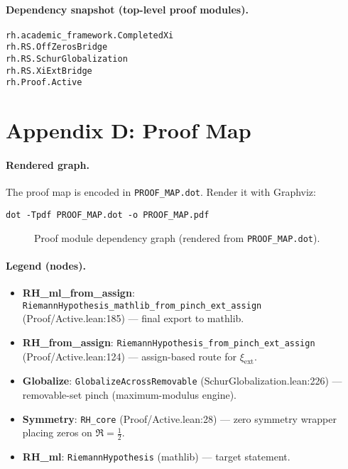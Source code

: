 \documentclass[11pt]{article}
\theoremstyle{plain}
\theoremstyle{definition}
\begin{document}
\paragraph{Dependency snapshot (top-level proof modules).}
{\small
\begin{verbatim}
rh.academic_framework.CompletedXi
rh.RS.OffZerosBridge
rh.RS.SchurGlobalization
rh.RS.XiExtBridge
rh.Proof.Active
\end{verbatim}
}

\section*{Appendix D: Proof Map}

\paragraph{Rendered graph.}
The proof map is encoded in \texttt{PROOF\_MAP.dot}. Render it with Graphviz:
{\small
\begin{verbatim}
dot -Tpdf PROOF_MAP.dot -o PROOF_MAP.pdf
\end{verbatim}
}

\begin{figure}[h]
  \centering
  \caption{Proof module dependency graph (rendered from \texttt{PROOF\_MAP.dot}).}
\end{figure}

\paragraph{Legend (nodes).}
\begin{itemize}
  \item \textbf{RH\_ml\_from\_assign}: \texttt{RiemannHypothesis\_mathlib\_from\_pinch\_ext\_assign} (Proof/Active.lean:185) — final export to mathlib.
  \item \textbf{RH\_from\_assign}: \texttt{RiemannHypothesis\_from\_pinch\_ext\_assign} (Proof/Active.lean:124) — assign-based route for \(\xi_{\mathrm{ext}}\).
  \item \textbf{Globalize}: \texttt{GlobalizeAcrossRemovable} (SchurGlobalization.lean:226) — removable-set pinch (maximum-modulus engine).
  \item \textbf{Symmetry}: \texttt{RH\_core} (Proof/Active.lean:28) — zero symmetry wrapper placing zeros on \(\Re=\tfrac12\).
  \item \textbf{RH\_ml}: \texttt{RiemannHypothesis} (mathlib) — target statement.
\end{itemize}
\end{document}
